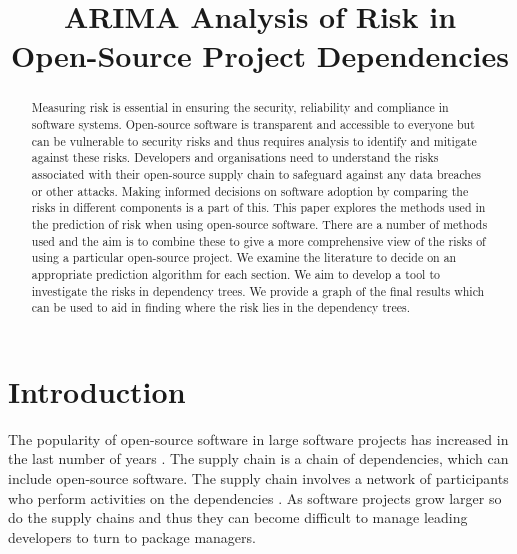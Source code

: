\documentclass[10pt, compsoc, conference]{IEEEtran}
\begin{document}
\title{ARIMA Analysis of Risk in \\Open-Source Project Dependencies}

\author{
\and
{}
    }

\maketitle

\vspace*{-1.5234cm}

\thispagestyle{plain}
\pagestyle{plain}

\begin{description}
    \item[]
    \begin{center}
        \end{center}
    \item[]
\end{description}


\begin{abstract}
Measuring risk is essential in ensuring the security, reliability and compliance in software systems. Open-source software is transparent and accessible to everyone but can be vulnerable to security risks and thus requires analysis to identify and mitigate against these risks. Developers and organisations need to understand the risks associated with their open-source supply chain to safeguard against any data breaches or other attacks. Making informed decisions on software adoption by comparing the risks in different components is a part of this. This paper explores the methods used in the prediction of risk when using open-source software. There are a number of methods used and the aim is to combine these to give a more comprehensive view of the risks of using a particular open-source project. We examine the literature to decide on an appropriate prediction algorithm for each section. We aim to develop a tool to investigate the risks in dependency trees. We provide a graph of the final results which can be used to aid in finding where the risk lies in the dependency trees. 
\end{abstract}

\section{Introduction}
The popularity of open-source software in large software projects has increased in the last number of years \cite{zajdel_open_2022}. The supply chain is a chain of dependencies, which can include open-source software. The supply chain involves a network of participants who perform activities on the dependencies \cite{k_singi_trusted_2019}. As software projects grow larger so do the supply chains and thus they can become difficult to manage leading developers to turn to package managers. 
\end{document}
